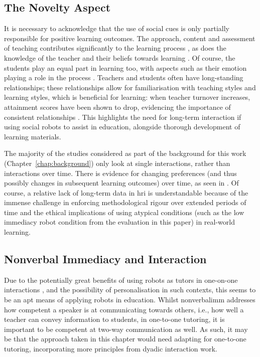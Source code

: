 \subsection{The Novelty Aspect} \label{sec:wider}
It is necessary to acknowledge that the use of social cues is only partially responsible for positive learning outcomes. The approach, content and assessment of teaching contributes significantly to the learning process \citep{coe2014makes}, as does the knowledge of the teacher \citep{hill2005effects} and their beliefs towards learning \citep{askew1997effective}. Of course, the students play an equal part in learning too, with aspects such as their emotion playing a role in the process \citep{garner2010emotional}. Teachers and students often have long-standing relationships; these relationships allow for familiarisation with teaching styles and learning styles, which is beneficial for learning: when teacher turnover increases, attainment scores have been shown to drop, evidencing the importance of consistent relationships \citep{ronfeldt2013teacher}. This highlights the need for long-term interaction if using social robots to assist in education, alongside thorough development of learning materials.

The majority of the studies considered as part of the background for this work (Chapter~\ref{chap:background}) only look at single interactions, rather than interactions over time. There is evidence for changing preferences (and thus possibly changes in subsequent learning outcomes) over time, as seen in \citet{wang2010facial}. Of course, a relative lack of long-term data in \acrshort{hri} is understandable because of the immense challenge in enforcing methodological rigour over extended periods of time and the ethical implications of using atypical conditions (such as the low immediacy robot condition from the evaluation in this paper) in real-world learning.

\subsection{Nonverbal Immediacy and Interaction}
Due to the potentially great benefits of using robots as tutors in one-on-one interactions \citep{bloom1984sigma, vanlehn2011relative}, and the possibility of personalisation in such contexts, this seems to be an apt means of applying robots in education. Whilst \gls{nonverbalimm} addresses how competent a speaker is at communicating towards others, i.e., how well a teacher can convey information to students, in one-to-one tutoring, it is important to be competent at two-way communication as well. As such, it may be that the approach taken in this chapter would need adapting for one-to-one tutoring, incorporating more principles from dyadic interaction work.

